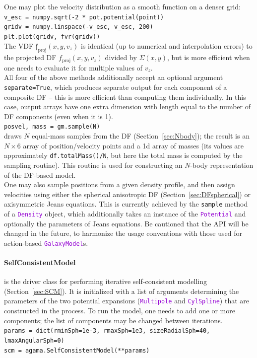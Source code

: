 \documentclass[12pt]{article}
\newcommand{\ttt}[1]{\textcolor{darkviolet}{\texttt{#1}}}
\begin{document}
One may plot the velocity distribution as a smooth function on a denser grid:\\[1mm]
\texttt{v_esc = numpy.sqrt(-2 * pot.potential(point))\\
gridv = numpy.linspace(-v_esc, v_esc, 200)\\
plt.plot(gridv, fvr(gridv))} \\[1mm]
The VDF $\mathfrak{f}_\mathrm{proj}(x,y,v_z)$ is identical (up to numerical and interpolation errors) to the projected DF $f_\mathrm{proj}(x,y,v_z)$ divided by $\Sigma(x,y)$, but is more efficient when one needs to evaluate it for multiple values of $v_z$.
\\[2mm]
All four of the above methods additionally accept an optional argument \texttt{separate=True}, which produces separate output for each component of a composite DF -- this is more efficient than computing them individually. In this case, output arrays have one extra dimension with length equal to the number of DF components (even when it is 1).
\\[2mm]
\texttt{posvel, mass = gm.sample(N)}\\
draws $N$ equal-mass samples from the DF (Section~\ref{sec:Nbody}); the result is an $N\times6$ array of position/velocity points and a 1d array of masses (its values are approximately \texttt{df.totalMass()/N}, but here the total mass is computed by the sampling routine). This routine is used for constructing an $N$-body representation of the DF-based model.
\\[2mm]
One may also sample positions from a given density profile, and then assign velocities using either the spherical anisotropic DF (Section~\ref{sec:DFspherical}) or axisymmetric Jeans equations. This is currently achieved by the \texttt{sample} method of a \ttt{Density} object, which additionally takes an instance of the \ttt{Potential} and optionally the parameters of Jeans equations. Be cautioned that the API will be changed in the future, to harmonize the usage conventions with those used for action-based \ttt{GalaxyModel}s.

\paragraph{SelfConsistentModel} is the driver class for performing iterative self-consistent modelling (Section~\ref{sec:SCM}). It is initialized with a list of arguments determining the parameters of the two potential expansions (\ttt{Multipole} and \ttt{CylSpline}) that are constructed in the process. To run the model, one needs to add one or more components; the list of components may be changed between iterations.\\
\texttt{params = dict(rminSph=1e-3, rmaxSph=1e3, sizeRadialSph=40, lmaxAngularSph=0)}\\
\texttt{scm = agama.SelfConsistentModel(**params)}
\end{document}
